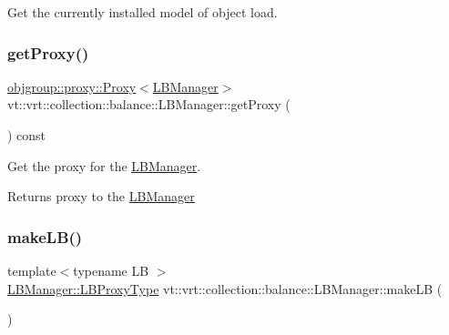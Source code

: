 Get the currently installed model of object load. 

\mbox{\label{structvt_1_1vrt_1_1collection_1_1balance_1_1_l_b_manager_aa0fbba6d90873e5fa6e40767efcabb5c}} 
\subsubsection{\texorpdfstring{get\+Proxy()}{getProxy()}}
{\footnotesize\ttfamily \hyperlink{structvt_1_1objgroup_1_1proxy_1_1_proxy}{objgroup\+::proxy\+::\+Proxy}$<$\hyperlink{structvt_1_1vrt_1_1collection_1_1balance_1_1_l_b_manager}{L\+B\+Manager}$>$ vt\+::vrt\+::collection\+::balance\+::\+L\+B\+Manager\+::get\+Proxy (\begin{DoxyParamCaption}{ }\end{DoxyParamCaption}) const\hspace{0.3cm}{\ttfamily [inline]}}



Get the proxy for the \hyperlink{structvt_1_1vrt_1_1collection_1_1balance_1_1_l_b_manager}{L\+B\+Manager}. 

\begin{DoxyReturn}{Returns}
proxy to the {\ttfamily \hyperlink{structvt_1_1vrt_1_1collection_1_1balance_1_1_l_b_manager}{L\+B\+Manager}} 
\end{DoxyReturn}
\mbox{\label{structvt_1_1vrt_1_1collection_1_1balance_1_1_l_b_manager_a9e413c41427dcb83f46fbe5d3c110cd7}} 
\subsubsection{\texorpdfstring{make\+L\+B()}{makeLB()}}
{\footnotesize\ttfamily template$<$typename LB $>$ \\
\hyperlink{structvt_1_1vrt_1_1collection_1_1balance_1_1_l_b_manager_a8b1a7735366beb85c2c2ccc3912cdd80}{L\+B\+Manager\+::\+L\+B\+Proxy\+Type} vt\+::vrt\+::collection\+::balance\+::\+L\+B\+Manager\+::make\+LB (\begin{DoxyParamCaption}{ }\end{DoxyParamCaption})\hspace{0.3cm}{\ttfamily [protected]}}



